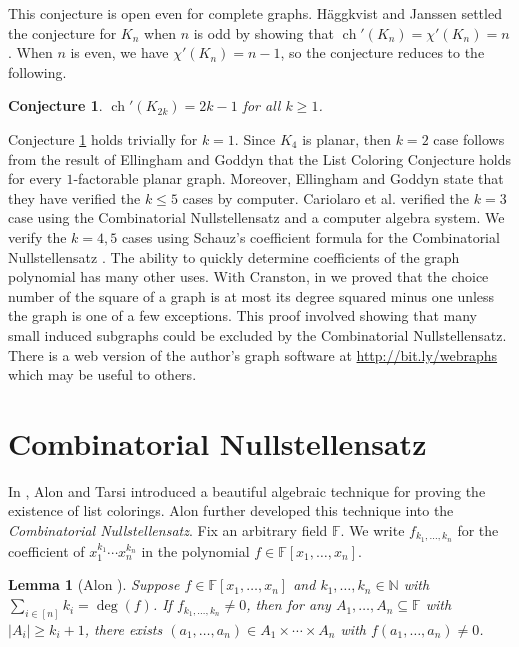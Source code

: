 \documentclass[12pt]{article}
\theoremstyle{plain}
\newtheorem{lem}[thm]{Lemma}
\newtheorem{conjecture}[thm]{Conjecture}
\theoremstyle{definition}
\theoremstyle{remark}
\newcommand{\IN}{\mathbb{N}}
\newcommand{\card}[1]{\left|#1\right|}
\newcommand{\irange}[1]{\left[#1\right]}
\newcommand{\ch}{\operatorname{ch}}
\begin{document}
This conjecture is open even for complete graphs.  H{\"a}ggkvist and Janssen \cite{haggkvist1997new} settled the conjecture for $K_n$ when $n$ is odd by showing that $\ch'(K_n) = \chi'(K_n) = n$.  When $n$ is even, we have $\chi'(K_n) = n - 1$, so the conjecture reduces to the following.

\begin{conjecture}\label{CCC}
$\ch'(K_{2k}) = 2k - 1$ for all $k \ge 1$.
\end{conjecture}

Conjecture \ref{CCC} holds trivially for $k = 1$.  Since $K_4$ is planar, then $k=2$ case follows from the result of  Ellingham and Goddyn \cite{ellingham1996list} that the List Coloring Conjecture holds for every $1$-factorable planar graph.   Moreover, Ellingham and Goddyn \cite{ellingham1996list} state that they have verified the $k \le 5$ cases by computer. Cariolaro et al. verified the $k = 3$ case using the Combinatorial Nullstellensatz and a computer algebra system.  We verify the $k=4,5$ cases using Schauz's coefficient formula for the Combinatorial Nullstellensatz \cite{schauz2008algebraically}.  The ability to quickly determine coefficients of the graph polynomial has many other uses.  With Cranston, in \cite{shades} we proved that the choice number of the square of a graph is at most its degree squared minus one unless the graph is one of a few exceptions.  This proof involved showing that many small induced subgraphs could be excluded by the Combinatorial Nullstellensatz.  There is a web version of the author's graph software at \url{http://bit.ly/webraphs} which may be useful to others.

\section{Combinatorial Nullstellensatz}
In \cite{Alon1992125}, Alon and Tarsi introduced a beautiful algebraic technique for proving the existence of list colorings.  Alon \cite{Alon19997} further developed this technique into the \emph{Combinatorial Nullstellensatz}.  Fix an arbitrary field $\mathbb{F}$. We write $f_{k_1, \ldots, k_n}$ for the coefficient of $x_1^{k_1}\cdots x_n^{k_n}$ in the polynomial $f \in \mathbb{F}[x_1, \ldots, x_n]$. 

\begin{lem}[Alon \cite{Alon19997}]\label{null}
Suppose $f \in \mathbb{F}[x_1, \ldots, x_n]$ and $k_1, \ldots, k_n \in \IN$ with $\sum_{i \in \irange{n}} k_i = \deg(f)$.  If $f_{k_1, \ldots, k_n} \ne 0$, then for any $A_1, \ldots, A_n \subseteq \mathbb{F}$ with $\card{A_i} \ge k_i + 1$, there exists $(a_1, \ldots, a_n) \in A_1 \times \cdots \times A_n$ with $f(a_1, \ldots, a_n) \ne 0$.
\end{lem}
\end{document}
